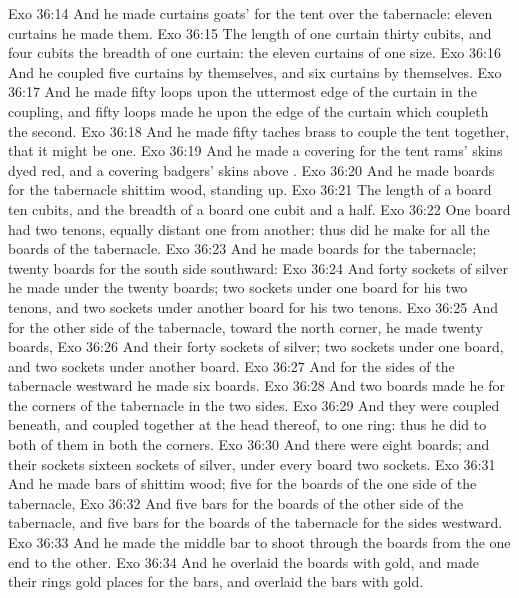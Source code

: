 \vs Exo 36:14 And he made curtains  goats'  for the tent over the tabernacle: eleven curtains he made them.
\vs Exo 36:15 The length of one curtain  thirty cubits, and four cubits  the breadth of one curtain: the eleven curtains  of one size.
\vs Exo 36:16 And he coupled five curtains by themselves, and six curtains by themselves.
\vs Exo 36:17 And he made fifty loops upon the uttermost edge of the curtain in the coupling, and fifty loops made he upon the edge of the curtain which coupleth the second.
\vs Exo 36:18 And he made fifty taches  brass to couple the tent together, that it might be one.
\vs Exo 36:19 And he made a covering for the tent  rams' skins dyed red, and a covering  badgers' skins above .
\vs Exo 36:20 And he made boards for the tabernacle  shittim wood, standing up.
\vs Exo 36:21 The length of a board  ten cubits, and the breadth of a board one cubit and a half.
\vs Exo 36:22 One board had two tenons, equally distant one from another: thus did he make for all the boards of the tabernacle.
\vs Exo 36:23 And he made boards for the tabernacle; twenty boards for the south side southward:
\vs Exo 36:24 And forty sockets of silver he made under the twenty boards; two sockets under one board for his two tenons, and two sockets under another board for his two tenons.
\vs Exo 36:25 And for the other side of the tabernacle,  toward the north corner, he made twenty boards,
\vs Exo 36:26 And their forty sockets of silver; two sockets under one board, and two sockets under another board.
\vs Exo 36:27 And for the sides of the tabernacle westward he made six boards.
\vs Exo 36:28 And two boards made he for the corners of the tabernacle in the two sides.
\vs Exo 36:29 And they were coupled beneath, and coupled together at the head thereof, to one ring: thus he did to both of them in both the corners.
\vs Exo 36:30 And there were eight boards; and their sockets  sixteen sockets of silver, under every board two sockets.
\vs Exo 36:31 And he made bars of shittim wood; five for the boards of the one side of the tabernacle,
\vs Exo 36:32 And five bars for the boards of the other side of the tabernacle, and five bars for the boards of the tabernacle for the sides westward.
\vs Exo 36:33 And he made the middle bar to shoot through the boards from the one end to the other.
\vs Exo 36:34 And he overlaid the boards with gold, and made their rings  gold  places for the bars, and overlaid the bars with gold.
